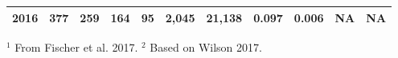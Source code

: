 \documentclass[]{article}
\begin{document}
\begin{longtable}[]{@{}rrrrrrrrrrr@{}}
\begin{minipage}[t]{0.06\columnwidth}
2016\strut
\end{minipage} & \begin{minipage}[t]{0.07\columnwidth}\raggedleft\strut
377\strut
\end{minipage} & \begin{minipage}[t]{0.07\columnwidth}\raggedleft\strut
259\strut
\end{minipage} & \begin{minipage}[t]{0.07\columnwidth}\raggedleft\strut
164\strut
\end{minipage} & \begin{minipage}[t]{0.07\columnwidth}\raggedleft\strut
95\strut
\end{minipage} & \begin{minipage}[t]{0.07\columnwidth}\raggedleft\strut
2,045\strut
\end{minipage} & \begin{minipage}[t]{0.05\columnwidth}\raggedleft\strut
21,138\strut
\end{minipage} & \begin{minipage}[t]{0.09\columnwidth}\raggedleft\strut
0.097\strut
\end{minipage} & \begin{minipage}[t]{0.05\columnwidth}\raggedleft\strut
0.006\strut
\end{minipage} & \begin{minipage}[t]{0.10\columnwidth}\raggedleft\strut
NA\strut
\end{minipage} & \begin{minipage}[t]{0.04\columnwidth}\raggedleft\strut
NA\strut
\end{minipage}\tabularnewline
\bottomrule
\end{longtable}
$^1$ From Fischer et al. 2017.
\newline
$^2$ Based on Wilson 2017.
\newpage

\noindent
\end{document}
